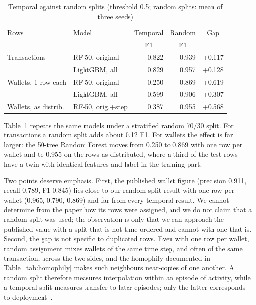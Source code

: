 \begin{table}[t]
\caption{Temporal against random splits (threshold 0.5; random splits: mean of three seeds)}\label{tab:split}
\centering
\setlength{\tabcolsep}{3pt}
\begin{tabular}{llrrr}
\toprule
Rows & Model & \multicolumn{1}{c}{Temporal} & \multicolumn{1}{c}{Random} & \multicolumn{1}{c}{Gap} \\
 & & \multicolumn{1}{c}{F1} & \multicolumn{1}{c}{F1} & \\
\midrule
Transactions & RF-50, original & 0.822 & 0.939 & +0.117 \\
 & LightGBM, all & 0.829 & 0.957 & +0.128 \\
\midrule
Wallets, 1 row each & RF-50, original & 0.250 & 0.869 & +0.619 \\
 & LightGBM, all & 0.599 & 0.906 & +0.307 \\
\midrule
Wallets, as distrib. & RF-50, orig.+step & 0.387 & 0.955 & +0.568 \\
\bottomrule
\end{tabular}
\end{table}

Table~\ref{tab:split} repeats the same models under a stratified random 70/30 split. For transactions a random split adds about 0.12 F1. For wallets the effect is far larger: the 50-tree Random Forest moves from 0.250 to 0.869 with one row per wallet and to 0.955 on the rows as distributed, where a third of the test rows have a twin with identical features and label in the training part.

Two points deserve emphasis. First, the published wallet figure (precision 0.911, recall 0.789, F1 0.845) lies close to our random-split result with one row per wallet (0.965, 0.790, 0.869) and far from every temporal result. We cannot determine from the paper how its rows were assigned, and we do not claim that a random split was used; the observation is only that we can approach the published value with a split that is not time-ordered and cannot with one that is. Second, the gap is not specific to duplicated rows. Even with one row per wallet, random assignment mixes wallets of the same time step, and often of the same transaction, across the two sides, and the homophily documented in Table~\ref{tab:homophily} makes such neighbours near-copies of one another. A random split therefore measures interpolation within an episode of activity, while a temporal split measures transfer to later episodes; only the latter corresponds to deployment~\cite{pendlebury2019,arp2022}.

